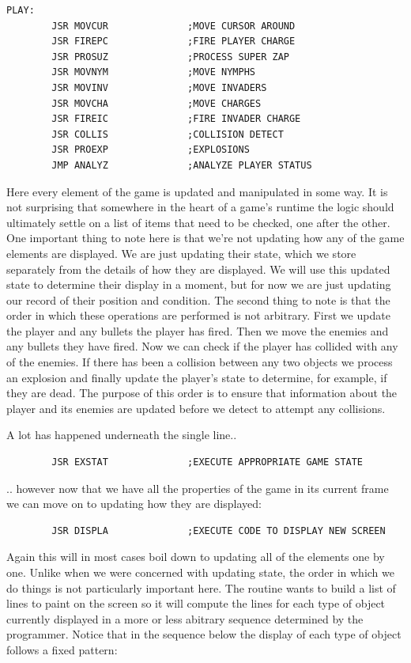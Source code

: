 \begin{lstlisting}
PLAY:
        JSR MOVCUR              ;MOVE CURSOR AROUND
        JSR FIREPC              ;FIRE PLAYER CHARGE
        JSR PROSUZ              ;PROCESS SUPER ZAP
        JSR MOVNYM              ;MOVE NYMPHS
        JSR MOVINV              ;MOVE INVADERS
        JSR MOVCHA              ;MOVE CHARGES
        JSR FIREIC              ;FIRE INVADER CHARGE
        JSR COLLIS              ;COLLISION DETECT
        JSR PROEXP              ;EXPLOSIONS
        JMP ANALYZ              ;ANALYZE PLAYER STATUS
\end{lstlisting}

Here every element of the game is updated and manipulated in some way. It is not surprising that somewhere in the heart of a
game's runtime the logic should ultimately settle on a list of items that need to be checked, one after the other. One important
thing to note here is that we're not updating how any of the game elements are displayed. We are just updating their state, which
we store separately from the details of how they are displayed. We will use this updated state to determine their display in a moment,
but for now we are just updating our record of their position and condition. The second thing to note is that the order in which
these operations are performed is not arbitrary. First we update the player and any bullets the player has fired. Then we move the
enemies and any bullets they have fired. Now we can check if the player has collided with any of the enemies. If there has been a
collision between any two objects we process an explosion and finally update the player's state to determine, for example, if they are dead. The purpose
of this order is to ensure that information about the player and its enemies are updated before we detect to attempt any collisions.

A lot has happened underneath the single line..

\begin{lstlisting}
        JSR EXSTAT              ;EXECUTE APPROPRIATE GAME STATE
\end{lstlisting}

.. however now that we have all the properties of the game in its current frame we can move on to updating how they are displayed:
\begin{lstlisting}
        JSR DISPLA              ;EXECUTE CODE TO DISPLAY NEW SCREEN
\end{lstlisting}

Again this will in most cases boil down to updating all of the elements one by one. Unlike when we were concerned with updating
state, the order in which we do things is not particularly important here. The  routine wants to build a list of lines
to paint on the screen so it will compute the lines for each type of object currently displayed in a more or less abitrary sequence
determined by the programmer. Notice that in the sequence below the display of each type of object follows a fixed pattern:

